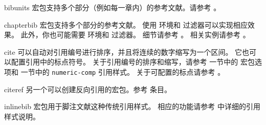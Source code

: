 \begin{marglist}
\item[bibunits]
 宏包支持多个部分（例如每一章内）的参考文献。请参考 。

\item[chapterbib]
 宏包支持多个部分的参考文献。
使用  环境和  过滤器可以实现相应效果。
此外，你也可能需要  环境和  过滤器。
细节请参考 。
相关实例请参考 。

\item[cite]
 可以自动对引用编号进行排序，并且将连续的数字缩写为一个区间。
它也可以配置引用中的标点符号。
关于引用编号的排序和缩写，请参考  一节中的  宏包选项和  一节中的 \texttt{numeric-comp} 引用样式。
关于可配置的标点请参考 。

\item[citeref]
另一个可以创建反向引用的宏包。参考  条目。

\item[inlinebib]
 宏包用于脚注文献这种传统引用样式。
相应的功能请参考  中详细的引用样式说明。


\end{marglist}
